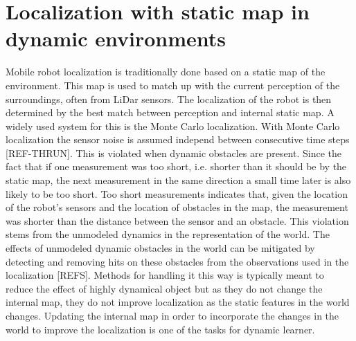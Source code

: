 \section{Localization with static map in dynamic environments}
Mobile robot localization is traditionally done based on a static map of the environment. This map is used to match up with the current perception of the surroundings, often from LiDar sensors. The localization of the robot is then determined by the best match between perception and internal static map. A widely used system for this is the Monte Carlo localization. With Monte Carlo localization the sensor noise is assumed independ between consecutive time steps [REF-THRUN]. This is violated when dynamic obstacles are present. Since the fact that if one measurement was too short, i.e. shorter than it should be by the static map, the next measurement in the same direction a small time later is also likely to be too short. Too short measurements indicates that, given the location of the robot’s sensors and the location of obstacles in the map, the measurement was shorter than the distance between the sensor and an obstacle. This violation stems from the unmodeled dynamics in the representation of the world. The effects of unmodeled dynamic obstacles in the world can be mitigated by detecting and removing hits on these obstacles from the observations used in the localization [REFS]. Methods for handling it this way is typically meant to reduce the effect of highly dynamical object but as they do not change the internal map, they do not improve localization as the static features in the world changes. Updating the internal map in order to incorporate the changes in the world to improve the localization is one of the tasks for dynamic learner. 
